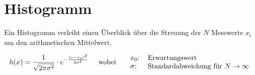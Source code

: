 \section{Histogramm}

Ein Histogramm verleiht einen \"Uberblick \"uber die Streuung der $N$ Messwerte $x_i$ um den
arithmetischen Mittelwert.

\begin{equation}
    h(x) = \frac{1}{\sqrt{ 2\pi\sigma^2 }} \cdot e^{-\frac{ (x-x_0)^2 }{ 2\sigma^2 }}
    \hspace{5mm} \textrm{wobei} \hspace{5mm}
    \begin{tabular}{ll}
        $x_0$: & Erwartungswert \\
        $\sigma$: & Standardabweichung f\"ur $N \to \infty$ \\
    \end{tabular}
\end{equation}

